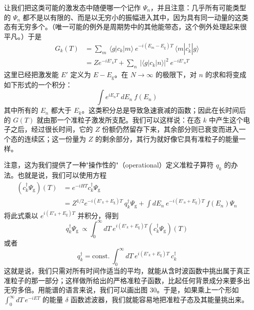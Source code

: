 让我们把这类可能的激发态中随便哪一个记作 $\Psi_{n}$，并且注意：几乎所有可能类型的 $\Psi_{n}$ 都不是以有限的、而是以无穷小的振幅进入其中，因为具有同一动量的这类态有无穷多个。（唯一可能的例外是周期势中的其他能带态，这个例外处理起来很平凡。）于是
\begin{align*}
G_{k}(T) &= \sum_{m}\ \langle g|c_{k}|m\rangle\ e^{-i(E_{m}-E_{\mathrm{g}})T}\ \langle m|c^{\dagger}_{k}|g\rangle\\
&= Z e^{-iE'_{k}T} + \sum_{n}\ |\langle g|c_{k}|n\rangle|^{2}\ e^{-iE'_{n}T}
\end{align*}
这里已经把激发能 $E'$ 定义为 $E-E_{\mathrm{g}}$。在 $N\to\infty$ 的极限下，对 $n$ 的求和将变成如下形式的一个积分：
\begin{equation*}
\int e^{iE_{n}T}\ dE_{n}\ f(E_{n})
\end{equation*}
其中所有的 $E_{n}$ 都大于 $E_{k}$。这类积分总是导致急速衰减的函数；因此在长时间后的 $G(T)$ 就由那一个准粒子激发所支配。我们可以这样说：在态 $k$ 中产生这个电子之后，经过很长时间，它的 $Z$ 份额仍然留存下来，其余部分则已衰变而进入一个态的连续区；这一份量为 $Z$ 的剩余部分，其行为就好像它具有准粒子的能量一样。

注意，这为我们提供了一种"操作性的"（operational）定义准粒子算符 $q_{k}$ 的办法。也就是说，我们可以使用方程
\begin{align*}
\left(c^{\dagger}_{k}\Psi_{\mathrm{g}}\right)(T) &= e^{-iHT}c^{\dagger}_{k}\Psi_{\mathrm{g}}\\
&= Z^{1/2}e^{-i(E'_{k}+E_{\mathrm{g}})T}\ q^{\dagger}_{k}\Psi_{\mathrm{g}} + \int dE_{n}\ e^{-i(E'_{n}+E_{\mathrm{g}})T}\ f(E_{n})\Psi_{n}
\end{align*}
将此式乘以 $e^{i(E'_{k}+E_{\mathrm{g}})T}$ 并积分，得到
\begin{equation*}
q^{\dagger}_{k}\Psi_{\mathrm{g}}\ \propto \int_{0}^{\infty} dT\ e^{i(E'_{k}+E_{\mathrm{g}})T}\left(c^{\dagger}_{k}\Psi_{\mathrm{g}}\right)(T)
\end{equation*}
或者
\begin{equation*}
q^{\dagger}_{k} = \text{const.}\ \int_{0}^{\infty} dT\ e^{i(E'_{k}+E_{\mathrm{g}})T}\ c^{\dagger}_{k}
\end{equation*}
这就是说，我们只需对所有时间作适当的平均，就能从含时波函数中挑出属于真正准粒子的那一部分；这样做所给出的严格准粒子函数，比起任何背景成分来要多出无穷多倍。用能谱的语言来说，我们可以画出图 30。于是，如果乘上一个形如 $\int_{0}^{\infty}dT\ e^{-iET}$ 的能量 $\delta$ 函数滤波器，我们就能容易地把准粒子态及其能量挑出来。


